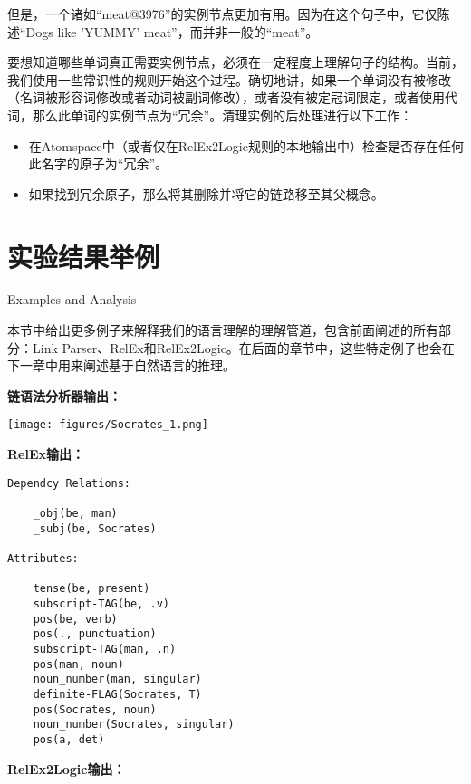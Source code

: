 但是，一个诸如“meat@3976”的实例节点更加有用。因为在这个句子中，它仅陈述“Dogs like ’YUMMY’ meat”，而并非一般的“meat”。

要想知道哪些单词真正需要实例节点，必须在一定程度上理解句子的结构。当前，我们使用一些常识性的规则开始这个过程。确切地讲，如果一个单词没有被修改（名词被形容词修改或者动词被副词修改），或者没有被定冠词限定，或者使用代词，那么此单词的实例节点为“冗余”。清理实例的后处理进行以下工作：

\begin{itemize}
\item 在Atomspace中（或者仅在RelEx2Logic规则的本地输出中）检查是否存在任何此名字的原子为“冗余”。
\item 如果找到冗余原子，那么将其删除并将它的链路移至其父概念。
\end{itemize}

\section{实验结果举例}{Examples and Analysis}  

本节中给出更多例子来解释我们的语言理解的理解管道，包含前面阐述的所有部分：Link Parser、RelEx和RelEx2Logic。在后面的章节中，这些特定例子也会在下一章中用来阐述基于自然语言的推理。



{\bf 链语法分析器输出：}

\texttt{[image: figures/Socrates\_1.png]}

{\bf RelEx输出：}

\begin{verbatim}
Dependcy Relations:

    _obj(be, man)
    _subj(be, Socrates)

Attributes:

    tense(be, present)
    subscript-TAG(be, .v)
    pos(be, verb)
    pos(., punctuation)
    subscript-TAG(man, .n)
    pos(man, noun)
    noun_number(man, singular)
    definite-FLAG(Socrates, T)
    pos(Socrates, noun)
    noun_number(Socrates, singular)
    pos(a, det)

\end{verbatim}

{\bf RelEx2Logic输出：}

